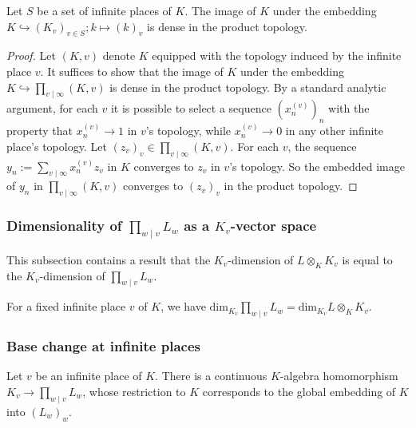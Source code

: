 \begin{theorem}
  \label{NumberField.InfinitePlace.Completion.denseRange_algebraMap_subtype_pi}
  \leanok
  Let $S$ be a set of infinite places of $K$. The image of $K$ under the embedding
  $K\hookrightarrow (K_v)_{v\in S}; k \mapsto (k)_v$ is dense in the product topology.
\end{theorem}
\begin{proof}
  Let $(K, v)$ denote $K$ equipped with the topology induced by the infinite place $v$.
  It suffices to show that the image of $K$ under the embedding
  $K\hookrightarrow \prod_{v\mid \infty}(K, v)$ is dense in the product topology.
  By a standard analytic argument, for each $v$ it is possible to select a sequence $(x_n^{(v)})_n$
  with the property that $x_n^{(v)} \to 1$ in $v$'s topology, while $x_n^{(v)} \to 0$ in any other
  infinite place's topology.
  Let $(z_v)_v \in \prod_{v\mid \infty}(K, v)$.
  For each $v$, the sequence $y_n := \sum_{v\mid\infty} x_n^{(v)}z_v$ in $K$ converges to
  $z_v$ in $v$'s topology.
  So the embedded image of $y_n$ in $\prod_{v\mid \infty}(K, v)$ converges to $(z_v)_v$ in the
  product topology.
\end{proof}

\subsubsection{Dimensionality of $\prod_{w\mid v}L_w$ as a $K_v$-vector space}

This subsection contains a result that the $K_v$-dimension of
$L \otimes_K K_v$ is equal to the $K_v$-dimension of $\prod_{w\mid v}L_w$.

\begin{theorem}
  \label{NumberField.InfinitePlace.Completion.finrank_pi_eq_finrank_tensorProduct}
  For a fixed infinite place $v$ of $K$, we have
  $\text{dim}_{K_v} \prod_{w\mid v} L_w = \text{dim}_{K_v} L\otimes_K K_v$.
\end{theorem}

\subsubsection{Base change at infinite places}

\begin{definition}
  \label{NumberField.InfinitePlace.Completion.piExtensionPlace}
  \leanok
  Let $v$ be an infinite place of $K$. There is a continuous $K$-algebra homomorphism
  $K_v \to \prod_{w\mid v}L_w$, whose restriction to $K$ corresponds to the global embedding
  of $K$ into $(L_w)_w$.
\end{definition}


